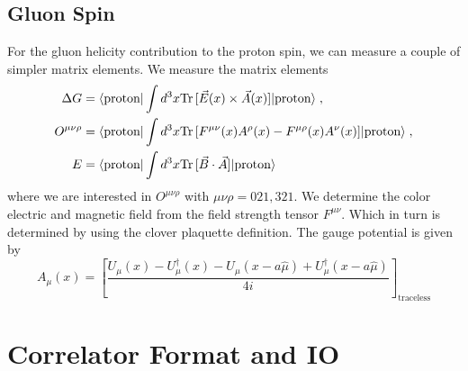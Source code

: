 \documentclass[a4paper,10pt]{scrartcl}
\newcommand{\tr}{\text{Tr\,}}
\begin{document}
\subsection{Gluon Spin}
For the gluon helicity contribution to the proton spin, we can measure a couple of simpler matrix elements. We measure the matrix elements
\begin{align}
    \Delta G &= \langle \text{proton} | \int d^3x \tr [ \vec E(x) \times \vec A(x)] | \text{proton} \rangle \; , \\
    O^{\mu \nu \rho} &= \langle \text{proton} | \int d^3x \tr [ F^{\mu \nu}(x) A^\rho(x) - F^{\mu \rho}(x) A^\nu(x)] | \text{proton} \rangle \; , \\
    E &= \langle \text{proton} | \int d^3x \tr [ \vec B \cdot \vec A] | \text{proton} \rangle \notag \;
\end{align}
where we are interested in $O^{\mu \nu \rho}$ with $\mu \nu \rho = 021, 321$. We determine the color electric and magnetic field from the field strength
tensor $F^{\mu \nu}$. Which in turn is determined by using the clover plaquette definition. The gauge potential is given by 
\begin{equation}
    A_\mu(x) = \left[ \frac{U_\mu(x)- U_\mu^\dagger(x) - U_\mu(x - a \hat \mu) + U_\mu^\dagger(x - a \hat \mu)}{4 i} \right]_\text{traceless}
\end{equation}

\section{Correlator Format and IO}
\end{document}
